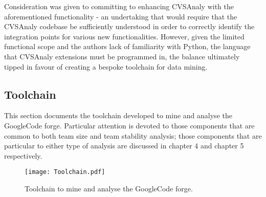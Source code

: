 Consideration was given to committing to enhancing CVSAnaly with the aforementioned functionality - an undertaking that would require that the CVSAnaly codebase be sufficiently understood in order to correctly identify the integration points for various new functionalities. However, given the limited functional scope and the authors lack of familiarity with Python, the language that CVSAnaly extensions must be programmed in, the balance ultimately tipped in favour of creating a bespoke toolchain for data mining. 

\subsection{Toolchain}
This section documents the toolchain developed to mine and analyse the GoogleCode forge. Particular attention is devoted to those components that are common to both team size and team stability analysis; those components that are particular to either type of analysis are discussed in chapter 4 and chapter 5 respectively.

\begin{figure}[htbp!] 
\centering    
\texttt{[image: Toolchain.pdf]}
\caption{Toolchain to mine and analyse the GoogleCode forge.}
\label{fig:Toolchain}
\end{figure}

